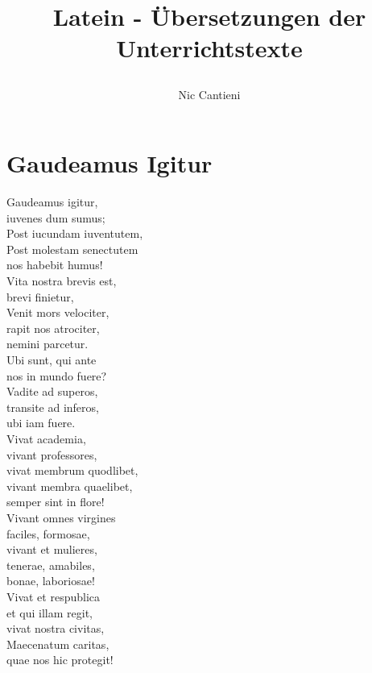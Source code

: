 \documentclass[a4paper]{article}
\begin{document}
\title{Latein - Übersetzungen der Unterrichtstexte \\
	\author{Nic Cantieni}}
	\maketitle
\tableofcontents
\newpage
\section{Gaudeamus Igitur}
\begin{multicols}{2}
	Gaudeamus igitur, \\
	iuvenes dum sumus; \\
	Post iucundam iuventutem, \\
	Post molestam senectutem \\
	nos habebit humus! \\
		
	Vita nostra brevis est, \\
	brevi finietur, \\
	Venit mors velociter, \\
	rapit nos atrociter, \\
	nemini parcetur. \\
	
	Ubi sunt, qui ante \\
	nos in mundo fuere? \\
	Vadite ad superos, \\
	transite ad inferos, \\
	ubi iam fuere. \\
	
	Vivat academia, \\ 
	vivant professores, \\
	vivat membrum quodlibet, \\
	vivant membra quaelibet, \\
	semper sint in flore! \\
	
	Vivant omnes virgines \\
	faciles, formosae, \\
	vivant et mulieres, \\
	tenerae, amabiles, \\
	bonae, laboriosae! \\
	
	Vivat et respublica \\
	et qui illam regit, \\
	vivat nostra civitas, \\
	Maecenatum caritas, \\
	quae nos hic protegit! \\
	

\end{multicols}
\end{document}
